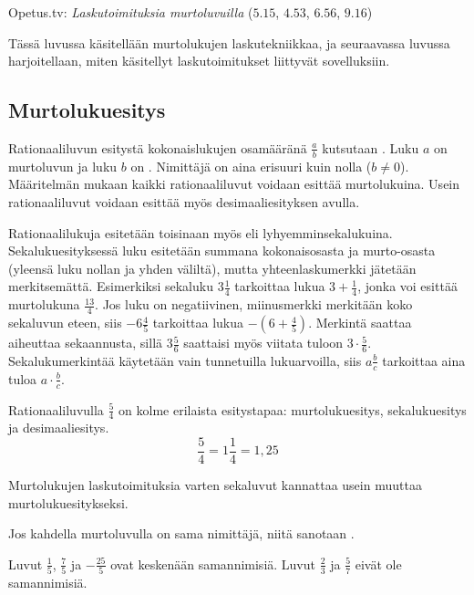 {Opetus.tv: \emph{Laskutoimituksia murtoluvuilla} ($5.15$, $4.53$, $6.56$, $9.16$)}

Tässä luvussa käsitellään murtolukujen laskutekniikkaa, ja seuraavassa luvussa harjoitellaan, miten käsitellyt laskutoimitukset liittyvät sovelluksiin.

\subsection{Murtolukuesitys}
Rationaaliluvun esitystä kokonaislukujen osamääränä $\frac{a}{b}$ kutsutaan . Luku $a$ on murtoluvun  ja luku $b$ on . Nimittäjä on aina erisuuri kuin nolla ($b\neq0 $). Määritelmän mukaan kaikki rationaaliluvut voidaan esittää murtolukuina. Usein rationaaliluvut voidaan esittää myös desimaaliesityksen avulla. %

Rationaalilukuja esitetään toisinaan myös  eli lyhyemminsekalukuina. Sekalukuesityksessä luku esitetään summana kokonaisosasta ja murto-osasta (yleensä luku nollan ja yhden väliltä), mutta yhteenlaskumerkki jätetään merkitsemättä. Esimerkiksi sekaluku $3\frac{1}{4}$ tarkoittaa lukua $3 + \frac{1}{4}$, jonka voi esittää murtolukuna $\frac{13}{4}$. Jos luku on negatiivinen, miinusmerkki merkitään koko sekaluvun eteen, siis $-6\frac{4}{5}$ tarkoittaa lukua $-(6 + \frac{4}{5})$. Merkintä saattaa aiheuttaa sekaannusta, sillä $3\frac{5}{6}$ saattaisi myös viitata tuloon $3\cdot \frac{5}{6}$. Sekalukumerkintää käytetään vain tunnetuilla lukuarvoilla, siis $a\frac{b}{c}$ tarkoittaa aina tuloa $a\cdot \frac{b}{c}$. 

\begin{esimerkki}
        Rationaaliluvulla $\frac{5}{4}$ on kolme erilaista esitystapaa: murtolukuesitys, sekalukuesitys ja desimaaliesitys.
        \[\frac{5}{4} = 1\frac{1}{4}=1,25 \]
\end{esimerkki} %

Murtolukujen laskutoimituksia varten sekaluvut kannattaa usein muuttaa murtolukuesitykseksi. 
\newpage

Jos kahdella murtoluvulla on sama nimittäjä, niitä sanotaan . %

\begin{esimerkki}
Luvut $\frac15$, $\frac75$ ja $-\frac{25}{5}$ ovat keskenään samannimisiä. Luvut $\frac23$ ja $\frac57$ eivät ole samannimisiä.
\end{esimerkki}

